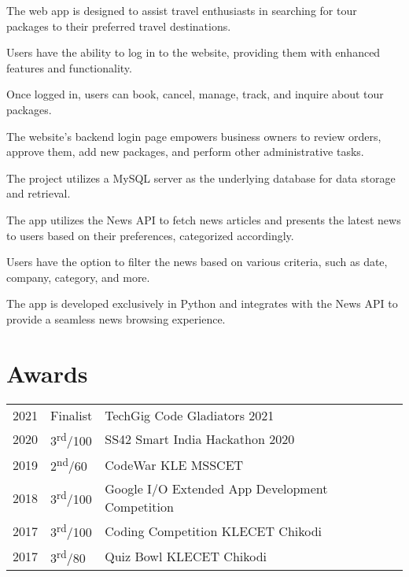 \documentclass[]{deedy-resume-openfont}
\begin{document}
\begin{minipage}[t]{0.66\textwidth}
\vspace{\topsep} %
\begin{tightemize}
\item The web app is designed to assist travel enthusiasts in searching for tour packages to their preferred travel destinations.
\item Users have the ability to log in to the website, providing them with enhanced features and functionality.
\item Once logged in, users can book, cancel, manage, track, and inquire about tour packages.
\item The website's backend login page empowers business owners to review orders, approve them, add new packages, and perform other administrative tasks.
\item The project utilizes a MySQL server as the underlying database for data storage and retrieval.
\end{tightemize}
\sectionsep

\vspace{\topsep} %
\begin{tightemize}
\item The app utilizes the News API to fetch news articles and presents the latest news to users based on their preferences, categorized accordingly.
\item Users have the option to filter the news based on various criteria, such as date, company, category, and more.
\item The app is developed exclusively in Python and integrates with the News API to provide a seamless news browsing experience.
\end{tightemize}
\sectionsep


\section{Awards} 
\begin{tabular}{rll}
2021	     & Finalist  & TechGig Code Gladiators 2021\\
2020	     & 3\textsuperscript{rd}/100   & SS42 Smart India Hackathon 2020\\
2019	     & 2\textsuperscript{nd}/60  & CodeWar KLE MSSCET \\
2018     & 3\textsuperscript{rd}/100 & Google I/O Extended App Development Competition  \\
2017     & 3\textsuperscript{rd}/100 & Coding Competition KLECET Chikodi \\
2017     & 3\textsuperscript{rd}/80 & Quiz Bowl KLECET Chikodi \\
\end{tabular}
\sectionsep

\end{minipage} 
\end{document}
